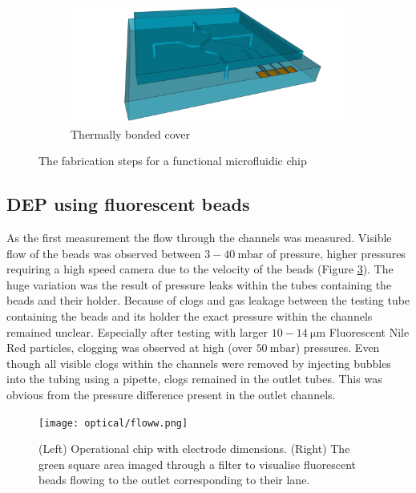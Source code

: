 \documentclass[final]{jyflluk}
\begin{document}
\begin{figure}
    \begin{subfigure}{\textwidth}
    \centering
        \includegraphics[width=\linewidth]{steps/11.Finished.png} 
        \caption{Thermally bonded cover} \label{fig:process11}
    \end{subfigure}
    \caption{The fabrication steps for a functional microfluidic chip} \label{fig:processFULL}
\end{figure}


\newpage
\newpage

\subsection{DEP using fluorescent beads}

As the first measurement the flow through the channels was measured. Visible flow of the beads was observed between  $3-\SI{40}{\milli \bar}$ of pressure, higher pressures requiring a high speed camera due to the velocity of the beads (Figure \ref{fig:flow}). The huge variation was the result of pressure leaks within the tubes containing the beads and their holder. Because of clogs and gas leakage between the testing tube containing the beads and its holder the exact pressure within the channels remained unclear. Especially after testing with larger $10-\SI{14}{\micro \metre}$  Fluorescent Nile Red particles, clogging was observed at high (over $\SI{50}{\milli \bar}$) pressures. Even though all visible clogs within the channels were removed by injecting bubbles into the tubing using a pipette, clogs remained in the outlet tubes. This was obvious from the pressure difference present in the outlet channels. 

\begin{figure}[h]
    \centering
    \texttt{[image: optical/floww.png]}
    \caption{(Left) Operational chip with electrode dimensions. (Right) The green square area imaged through a filter to visualise fluorescent beads flowing to the outlet corresponding to their lane.}
    \label{fig:flow}
\end{figure}
\end{document}
